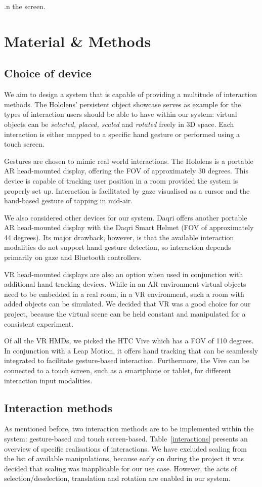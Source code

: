 .n the screen.\section{Material \& Methods}
\subsection{Choice of device}
We aim to design a system that is capable of providing a multitude of interaction methods. The Hololens' persistent object showcase serves as example for the types of interaction users should be able to have within our system: virtual objects can be \textit{selected, placed, scaled} and \textit{rotated} freely in 3D space. Each interaction is either mapped to a specific hand gesture or performed using a touch screen.

Gestures are chosen to mimic real world interactions. The Hololens is a portable AR head-mounted display, offering the FOV of approximately 30 degrees. This device is capable of tracking user position in a room provided the system is properly set up. Interaction is facilitated by gaze visualised as a cursor and the hand-based gesture of tapping in mid-air. 

We also considered other devices for our system. Daqri offers another portable AR head-mounted display with the Daqri Smart Helmet (FOV of approximately 44 degrees). Its major drawback, however, is that the available interaction modalities do not support hand gesture detection, so interaction depends primarily on gaze and Bluetooth controllers. 

VR head-mounted displays are also an option when used in conjunction with additional hand tracking devices. While in an AR environment virtual objects need to be embedded in a real room, in a VR environment, such a room with added objects can be simulated. We decided that VR was a good choice for our project, because the virtual scene can be held constant and manipulated for a consistent experiment.

Of all the VR HMDs, we picked the HTC Vive which has a FOV of 110 degrees. In conjunction with a Leap Motion, it offers hand tracking that can be seamlessly integrated to facilitate gesture-based interaction. Furthermore, the Vive can be connected to a touch screen, such as a smartphone or tablet, for different interaction input modalities.
\subsection{Interaction methods}
As mentioned before, two interaction methods are to be implemented within the system: gesture-based and touch screen-based. Table~\ref{interactions} presents an overview of specific realisations of interactions. We have excluded scaling from the list of available manipulations, because early on during the project it was decided that scaling was inapplicable for our use case. However, the acts of selection/deselection, translation and rotation are enabled in our system.

